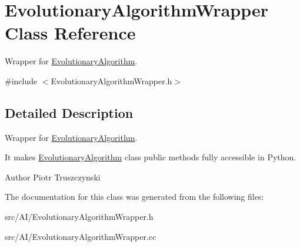 \hypertarget{classEvolutionaryAlgorithmWrapper}{}\section{Evolutionary\+Algorithm\+Wrapper Class Reference}
\label{classEvolutionaryAlgorithmWrapper}


Wrapper for \hyperlink{classEvolutionaryAlgorithm}{Evolutionary\+Algorithm}.  




{\ttfamily \#include $<$Evolutionary\+Algorithm\+Wrapper.\+h$>$}



\subsection{Detailed Description}
Wrapper for \hyperlink{classEvolutionaryAlgorithm}{Evolutionary\+Algorithm}. 

It makes \hyperlink{classEvolutionaryAlgorithm}{Evolutionary\+Algorithm} class public methods fully accessible in Python. \begin{DoxyAuthor}{Author}
Piotr Truszczynski 
\end{DoxyAuthor}


The documentation for this class was generated from the following files\+:\begin{DoxyCompactItemize}
\item 
src/\+A\+I/Evolutionary\+Algorithm\+Wrapper.\+h\item 
src/\+A\+I/Evolutionary\+Algorithm\+Wrapper.\+cc\end{DoxyCompactItemize}
